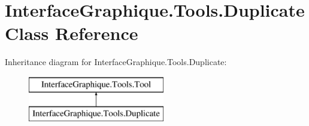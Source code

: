 \hypertarget{class_interface_graphique_1_1_tools_1_1_duplicate}{}\section{Interface\+Graphique.\+Tools.\+Duplicate Class Reference}
\label{class_interface_graphique_1_1_tools_1_1_duplicate}
Inheritance diagram for Interface\+Graphique.\+Tools.\+Duplicate\+:\begin{figure}[H]
\begin{center}
\leavevmode
\includegraphics[height=2.000000cm]{class_interface_graphique_1_1_tools_1_1_duplicate}
\end{center}
\end{figure}
